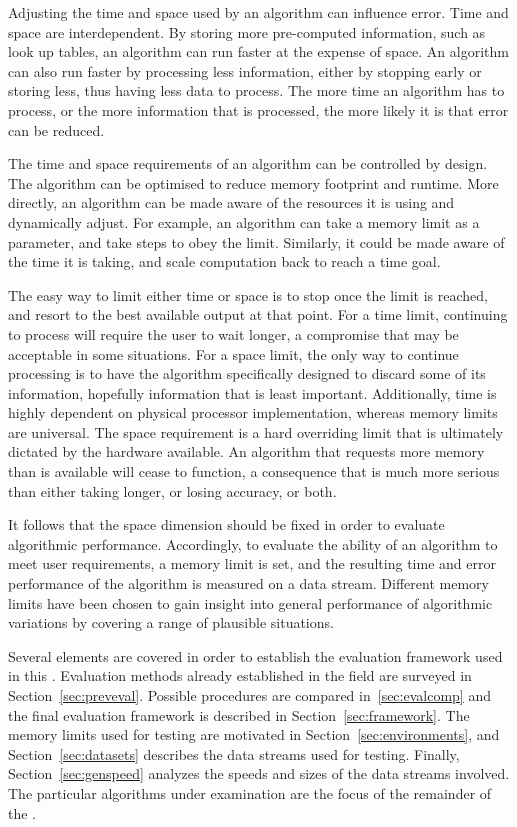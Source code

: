 Adjusting the time and space used by an algorithm can influence error. Time and space are interdependent. By storing more pre-computed information, such as look up tables, an algorithm can run faster at the expense of space. An algorithm can also run faster by processing less information, either by stopping early or storing less, thus having less data to process. The more time an algorithm has to process, or the more information that is processed, the more likely it is that error can be reduced.

The time and space requirements of an algorithm can be controlled by design. The algorithm can be optimised to reduce memory footprint and runtime. More directly, an algorithm can be made aware of the resources it is using and dynamically adjust. For example, an algorithm can take a memory limit as a parameter, and take steps to obey the limit. Similarly, it could be made aware of the time it is taking, and scale computation back to reach a time goal.

The easy way to limit either time or space is to stop once the limit is reached, and resort to the best available output at that point. For a time limit, continuing to process will require the user to wait longer, a compromise that may be acceptable in some situations. For a space limit, the only way to continue processing is to have the algorithm specifically designed to discard some of its information, hopefully information that is least important.
Additionally, time is highly dependent on physical processor implementation, whereas memory limits are universal.
The space requirement is a hard overriding limit that is ultimately dictated by the hardware available. An algorithm that requests more memory than is available will cease to function, a consequence that is much more serious than either taking longer, or losing accuracy, or both.

It follows that the space dimension should be fixed in order to evaluate algorithmic performance. 
Accordingly, to evaluate the ability of an algorithm to meet user requirements, a memory limit is set, and the resulting time and error performance of the algorithm is measured on a data stream.
Different memory limits have been chosen to gain insight into general performance of algorithmic variations by covering a range of plausible situations.

Several elements are covered in order to establish the evaluation framework used in this \thesisc. Evaluation methods already established in the field are surveyed in Section~\ref{sec:preveval}. Possible procedures are compared in~\ref{sec:evalcomp} and the final evaluation framework is described in Section~\ref{sec:framework}. The memory limits used for testing are motivated in Section~\ref{sec:environments}, and Section~\ref{sec:datasets} describes the data streams used for testing. Finally, Section~\ref{sec:genspeed} analyzes the speeds and sizes of the data streams involved. The particular algorithms under examination are the focus of the remainder of the \thesisc. 

